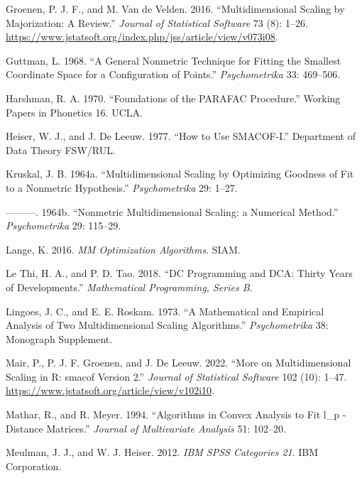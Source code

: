 \documentclass[
  12pt,
  letterpaper,
  DIV=11,
  numbers=noendperiod]{scrartcl}
\newlength{\cslhangindent}
\newenvironment{CSLReferences}[2] %
 {\begin{list}{}{%
  \setlength{\itemindent}{0pt}
  \setlength{\leftmargin}{0pt}
  \setlength{\parsep}{0pt}
  \ifodd #1
   \setlength{\leftmargin}{\cslhangindent}
   \setlength{\itemindent}{-1\cslhangindent}
  \fi
  \setlength{\itemsep}{#2\baselineskip}}}
 {\end{list}}
\begin{document}
\begin{CSLReferences}{1}{0}
Groenen, P. J. F., and M. Van de Velden. 2016. {``{Multidimensional
Scaling by Majorization: A Review}.''} \emph{Journal of Statistical
Software} 73 (8): 1--26.
\url{https://www.jstatsoft.org/index.php/jss/article/view/v073i08}.

Guttman, L. 1968. {``{A General Nonmetric Technique for Fitting the
Smallest Coordinate Space for a Configuration of Points}.''}
\emph{Psychometrika} 33: 469--506.

Harshman, R. A. 1970. {``{Foundations of the PARAFAC Procedure}.''}
Working Papers in Phonetics 16. UCLA.

Heiser, W. J., and J. De Leeuw. 1977. {``How to Use {SMACOF-I}.''}
Department of Data Theory FSW/RUL.

Kruskal, J. B. 1964a. {``{Multidimensional Scaling by Optimizing
Goodness of Fit to a Nonmetric Hypothesis}.''} \emph{Psychometrika} 29:
1--27.

---------. 1964b. {``{Nonmetric Multidimensional Scaling: a Numerical
Method}.''} \emph{Psychometrika} 29: 115--29.

Lange, K. 2016. \emph{MM Optimization Algorithms}. SIAM.

Le Thi, H. A., and P. D. Tao. 2018. {``{DC Programming and DCA: Thirty
Years of Developments}.''} \emph{Mathematical Programming, Series B}.

Lingoes, J. C., and E. E. Roskam. 1973. {``{A Mathematical and Empirical
Analysis of Two Multidimensional Scaling Algorithms}.''}
\emph{Psychometrika} 38: Monograph Supplement.

Mair, P., P. J. F. Groenen, and J. De Leeuw. 2022. {``{More on
Multidimensional Scaling in R: smacof Version 2}.''} \emph{Journal of
Statistical Software} 102 (10): 1--47.
\url{https://www.jstatsoft.org/article/view/v102i10}.

Mathar, R., and R. Meyer. 1994. {``Algorithms in Convex Analysis to Fit
l\_p -Distance Matrices.''} \emph{Journal of Multivariate Analysis} 51:
102--20.

Meulman, J. J., and W. J. Heiser. 2012. \emph{IBM SPSS Categories 21}.
IBM Corporation.


\end{CSLReferences}
\end{document}
